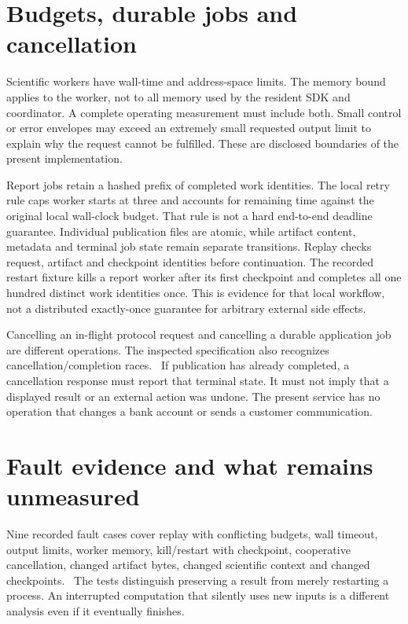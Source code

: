 \section{Budgets, durable jobs and cancellation}

Scientific workers have wall-time and address-space limits. The memory bound
applies to the worker, not to all memory used by the resident SDK and
coordinator. A complete operating measurement must include both. Small control
or error envelopes may exceed an extremely small requested output limit to
explain why the request cannot be fulfilled. These are disclosed boundaries of
the present implementation.~\citep{v12_in_runtime}

Report jobs retain a hashed prefix of completed work identities. The local
retry rule caps worker starts at three and accounts for remaining time against the original local wall-clock budget. That rule is not a hard end-to-end deadline guarantee. Individual publication files are atomic, while artifact content, metadata and terminal job state remain separate transitions. Replay checks request, artifact and checkpoint identities before continuation. The recorded restart fixture kills a report worker after its
first checkpoint and completes all one hundred distinct work identities once.
This is evidence for that local workflow, not a distributed exactly-once
guarantee for arbitrary external side effects.

Cancelling an in-flight protocol request and cancelling a durable application
job are different operations. The inspected specification also recognizes
cancellation/completion races.~\citep{v12_mcp_legacy_cancellation} If publication
has already completed, a cancellation response must report that terminal state.
It must not imply that a displayed result or an external action was undone.
The present service has no operation that changes a bank account or sends a
customer communication.

\section{Fault evidence and what remains unmeasured}

Nine recorded fault cases cover replay with conflicting budgets, wall timeout,
output limits, worker memory, kill/restart with checkpoint, cooperative
cancellation, changed artifact bytes, changed scientific context and changed
checkpoints.~\citep{v12_in_runtime} The tests distinguish preserving a result from
merely restarting a process. An interrupted computation that silently uses new
inputs is a different analysis even if it eventually finishes.

